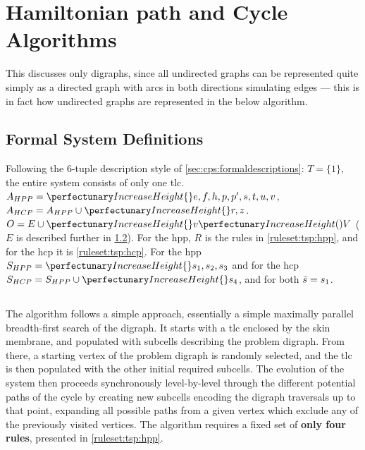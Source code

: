 \section{ Hamiltonian path and Cycle Algorithms}\label{sec:tsp:algohpp}
This  discusses only digraphs, since all undirected graphs can be represented quite simply as a directed graph with arcs in both directions simulating edges --- this is in fact how undirected graphs are represented in the below algorithm.

\subsection{Formal System Definitions}

Following the 6-tuple description style of \cref{sec:cps:formaldescriptions}:  \(T = \{1\}\), \ie{} the entire system consists of only one \gls{tlc}.  \(A_{HPP} = \cpset{e, f, h, p, p', s, t, u, v}\), \(A_{HCP} = A_{HPP} \cup \cpset{r, z}\).  \(O = E \cup \cpset{\cpfunc{v}{V}}\) (\(E\) is described further in \cref{sec:tsp:hpp}).  For the \gls{hpp}, \(R\) is the rules in \cref{ruleset:tsp:hpp}, and for the \gls{hcp} it is \cref{ruleset:tsp:hcp}.  For the \gls{hpp} \(S_{HPP} = \cpset{s_1, s_2, s_3}\) and for the \gls{hcp} \(S_{HCP} = S_{HPP} \cup \cpset{s_4}\), and for both \(\Bar{s} = s_1\).



\subsection{}\label{sec:tsp:hpp}

The algorithm follows a simple approach, essentially a simple maximally parallel breadth-first search of the digraph.  It starts with a \gls{tlc} enclosed by the skin membrane, and populated with subcells describing the problem digraph.  From there, a starting vertex of the problem digraph is randomly selected, and the \gls{tlc} is then populated with the other initial required subcells.  The evolution of the system then proceeds synchronously level-by-level through the different potential paths of the cycle by creating new subcells encoding the digraph traversals up to that point, expanding all possible paths from a given vertex which exclude any of the previously visited vertices.  The algorithm requires a fixed set of \textbf{only four rules}, presented in \cref{ruleset:tsp:hpp}.

